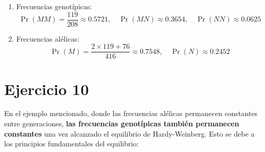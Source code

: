 \documentclass{article}
\begin{document}
	\begin{enumerate}[label=\alph*)]
		\item Frecuencias genotípicas:
		\[
		\Pr(MM) = \frac{119}{208} \approx 0.5721, \quad \Pr(MN) \approx 0.3654, \quad \Pr(NN) \approx 0.0625
		\]
		
		\item Frecuencias alélicas:
		\[
		\Pr(M) = \frac{2 \times 119 + 76}{416} \approx 0.7548, \quad \Pr(N) \approx 0.2452
		\]
	\end{enumerate}
	

	
	\section*{Ejercicio 10}
	En el ejemplo mencionado, donde las frecuencias alélicas permanecen constantes entre generaciones, \textbf{las frecuencias genotípicas también permanecen constantes} una vez alcanzado el equilibrio de Hardy-Weinberg. Esto se debe a los principios fundamentales del equilibrio:
	
\end{document}
